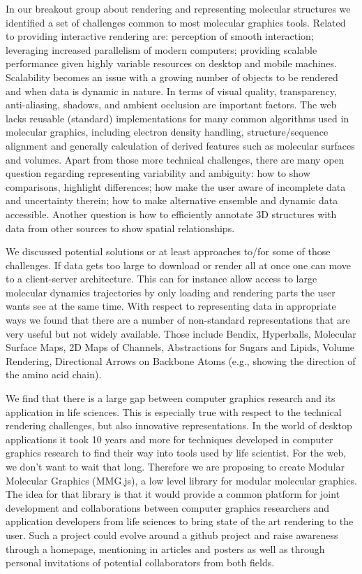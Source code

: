 \documentclass[a4paper]{article}
\begin{document}
In our breakout group about rendering and representing molecular structures we identified a set of challenges common to most molecular graphics tools. Related to providing interactive rendering are: perception of smooth interaction; leveraging increased parallelism of modern computers; providing scalable performance given highly variable resources on desktop and mobile machines. Scalability becomes an issue with a growing number of objects to be rendered and when data is dynamic in nature. In terms of visual quality, transparency, anti-aliasing, shadows, and ambient occlusion are important factors. The web lacks reusable (standard) implementations for many common algorithms used in molecular graphics, including electron density handling, structure/sequence alignment and generally calculation of derived features such as molecular surfaces and volumes. Apart from those more technical challenges, there are many open question regarding representing variability and ambiguity: how to show comparisons, highlight differences; how make the user aware of incomplete data and uncertainty therein; how to make alternative ensemble and dynamic data accessible. Another question is how to efficiently annotate 3D structures with data from other sources to show spatial relationships.

We discussed potential solutions or at least approaches to/for some of those challenges. If data gets too large to download or render all at once one can move to a client-server architecture. This can for instance allow access to large molecular dynamics trajectories by only loading and rendering parts the user wants see at the same time. With respect to representing data in appropriate ways we found that there are a number of non-standard representations that are very useful but not widely available. Those include Bendix, Hyperballs, Molecular Surface Maps, 2D Maps of Channels, Abstractions for Sugars and Lipids, Volume Rendering, Directional Arrows on Backbone Atoms (e.g., showing the direction of the amino acid chain).

We find that there is a large gap between computer graphics research and its application in life sciences. This is especially true with respect to the technical rendering challenges, but also innovative representations. In the world of desktop applications it took 10 years and more for techniques developed in computer graphics research to find their way into tools used by life scientist. For the web, we don't want to wait that long. Therefore we are proposing to create Modular Molecular Graphics (MMG.js), a low level library for modular molecular graphics. The idea for that library is that it would provide a common platform for joint development and collaborations between computer graphics researchers and application developers from life sciences to bring state of the art rendering to the user. Such a project could evolve around a github project and raise awareness through a homepage, mentioning in articles and posters as well as through personal invitations of potential collaborators from both fields.
\end{document}
